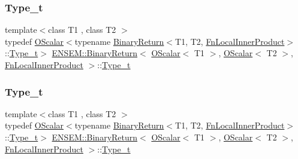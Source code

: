 \subsubsection{\texorpdfstring{Type\_t}{Type\_t}\hspace{0.1cm}{\footnotesize\ttfamily [1/2]}}
{\footnotesize\ttfamily template$<$class T1 , class T2 $>$ \\
typedef \mbox{\hyperlink{classENSEM_1_1OScalar}{O\+Scalar}}$<$typename \mbox{\hyperlink{structENSEM_1_1BinaryReturn}{Binary\+Return}}$<$T1, T2, \mbox{\hyperlink{structENSEM_1_1FnLocalInnerProduct}{Fn\+Local\+Inner\+Product}}$>$\+::\mbox{\hyperlink{structENSEM_1_1BinaryReturn_3_01OScalar_3_01T1_01_4_00_01OScalar_3_01T2_01_4_00_01FnLocalInnerProduct_01_4_a96c2eb7ff0bb862f8f194a8170dac35a}{Type\+\_\+t}}$>$ \mbox{\hyperlink{structENSEM_1_1BinaryReturn}{E\+N\+S\+E\+M\+::\+Binary\+Return}}$<$ \mbox{\hyperlink{classENSEM_1_1OScalar}{O\+Scalar}}$<$ T1 $>$, \mbox{\hyperlink{classENSEM_1_1OScalar}{O\+Scalar}}$<$ T2 $>$, \mbox{\hyperlink{structENSEM_1_1FnLocalInnerProduct}{Fn\+Local\+Inner\+Product}} $>$\+::\mbox{\hyperlink{structENSEM_1_1BinaryReturn_3_01OScalar_3_01T1_01_4_00_01OScalar_3_01T2_01_4_00_01FnLocalInnerProduct_01_4_a96c2eb7ff0bb862f8f194a8170dac35a}{Type\+\_\+t}}}

\mbox{\label{structENSEM_1_1BinaryReturn_3_01OScalar_3_01T1_01_4_00_01OScalar_3_01T2_01_4_00_01FnLocalInnerProduct_01_4_a96c2eb7ff0bb862f8f194a8170dac35a}} 
\subsubsection{\texorpdfstring{Type\_t}{Type\_t}\hspace{0.1cm}{\footnotesize\ttfamily [2/2]}}
{\footnotesize\ttfamily template$<$class T1 , class T2 $>$ \\
typedef \mbox{\hyperlink{classENSEM_1_1OScalar}{O\+Scalar}}$<$typename \mbox{\hyperlink{structENSEM_1_1BinaryReturn}{Binary\+Return}}$<$T1, T2, \mbox{\hyperlink{structENSEM_1_1FnLocalInnerProduct}{Fn\+Local\+Inner\+Product}}$>$\+::\mbox{\hyperlink{structENSEM_1_1BinaryReturn_3_01OScalar_3_01T1_01_4_00_01OScalar_3_01T2_01_4_00_01FnLocalInnerProduct_01_4_a96c2eb7ff0bb862f8f194a8170dac35a}{Type\+\_\+t}}$>$ \mbox{\hyperlink{structENSEM_1_1BinaryReturn}{E\+N\+S\+E\+M\+::\+Binary\+Return}}$<$ \mbox{\hyperlink{classENSEM_1_1OScalar}{O\+Scalar}}$<$ T1 $>$, \mbox{\hyperlink{classENSEM_1_1OScalar}{O\+Scalar}}$<$ T2 $>$, \mbox{\hyperlink{structENSEM_1_1FnLocalInnerProduct}{Fn\+Local\+Inner\+Product}} $>$\+::\mbox{\hyperlink{structENSEM_1_1BinaryReturn_3_01OScalar_3_01T1_01_4_00_01OScalar_3_01T2_01_4_00_01FnLocalInnerProduct_01_4_a96c2eb7ff0bb862f8f194a8170dac35a}{Type\+\_\+t}}}




